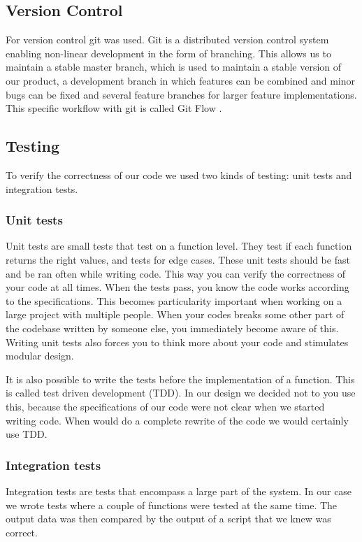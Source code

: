 \documentclass[a4paper, openany, oneside]{memoir}
\begin{document}
\subsection{Version Control}
\label{sec:version-control}
For version control git was used. Git is a distributed version control system enabling non-linear development in the form of branching. This allows us to maintain a stable master branch, which is used to maintain a stable version of our product, a development branch in which features can be combined and minor bugs can be fixed and several feature branches for larger feature implementations. This specific workflow with git is called Git Flow \cite{driessen2010successful}.

\subsection{Testing}
\label{sec:testing}
To verify the correctness of our code we used two kinds of testing: unit tests and integration tests.

\subsubsection{Unit tests}
Unit tests are small tests that test on a function level. They test if each function returns the right values, and tests for edge cases. These unit tests should be fast and be ran often while writing code. This way you can verify the correctness of your code at all times. When the tests pass, you know the code works according to the specifications. This becomes particularity important when working on a large project with multiple people. When your codes breaks some other part of the codebase written by someone else, you immediately become aware of this. Writing unit tests also forces you to think more about your code and stimulates modular design.

It is also possible to write the tests before the implementation of a function. This is called test driven development (TDD). In our design we decided not to you use this, because the specifications of our code were not clear when we started writing code. When would do a complete rewrite of the code we would certainly use TDD.

\subsubsection{Integration tests}
Integration tests are tests that encompass a large part of the system. In our case we wrote tests where a couple of functions were tested at the same time. The output data was then compared by the output of a \matlab{} script that we knew was correct.
\end{document}
